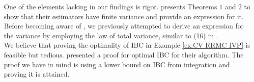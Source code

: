 \documentclass[a4paper,12pt]{article}
\begin{document}
One of the elements lacking in our findings is rigor.
\cite{ermakov_monte_2021} presents Theorems $1$ and $2$ to
show that their estimators have finite variance and provide an expression for it.
Before becoming aware of \cite{ermakov_monte_2021}, we
previously attempted to derive an expression for the variance
by employing the law of total variance, similar to (16) in \cite{rath_ears_2022}. \\
We believe that proving the optimality of IBC in Example \ref{ex:CV RRMC IVP} is feasible
but tedious.
\cite{daun_randomized_2011} presented a proof for optimal IBC for their algorithm.
The proof we have in mind is using a lower bound on IBC
from integration and proving it is attained.\\




\newpage
\begin{abstract}
  
\end{abstract}

\printbibliography
\newpage
\end{document}
